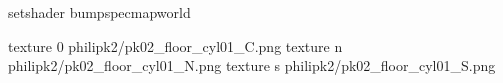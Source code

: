 setshader bumpspecmapworld

texture 0 philipk2/pk02_floor_cyl01_C.png
texture n philipk2/pk02_floor_cyl01_N.png
texture s philipk2/pk02_floor_cyl01_S.png

